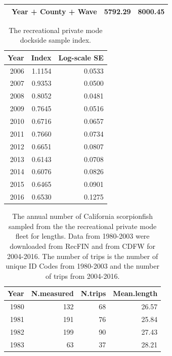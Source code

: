 \documentclass[12pt,]{article}
\begin{document}
\begin{table}[ht]
\begin{tabular}{lll}
  ~Year + County + Wave & \textbf{5792.29} & \textbf{8000.45} \\ 
   \hline
\end{tabular}
\end{table}\begin{table}[ht]
\centering
\caption{The recreational private mode 
                                            dockside sample index.} 
\label{tab:Fleet4_RecPR_dockside_index}
\begin{tabular}{rrr}
  \hline
Year & Index & Log-scale SE \\ 
  \hline
 2006 & 1.1154 & 0.0533 \\ 
   2007 & 0.9353 & 0.0500 \\ 
   2008 & 0.8052 & 0.0481 \\ 
   2009 & 0.7645 & 0.0516 \\ 
   2010 & 0.6716 & 0.0657 \\ 
   2011 & 0.7660 & 0.0734 \\ 
   2012 & 0.6651 & 0.0807 \\ 
   2013 & 0.6143 & 0.0708 \\ 
   2014 & 0.6076 & 0.0826 \\ 
   2015 & 0.6465 & 0.0901 \\ 
   2016 & 0.6530 & 0.1275 \\ 
   \hline
\end{tabular}
\end{table}\begin{table}[ht]
\centering
\caption{The annual number of California scorpionfish 
                                              sampled from the the recreational private 
                                              mode fleet for lengths. Data from 1980-2003
                                            were downloaded from RecFIN and from CDFW for
                                            2004-2016. The number of trips is the number
                                            of unique ID Codes from 1980-2003 and the 
                                            number of trips from 2004-2016.} 
\label{tab:Fleet4_lengthsample}
\begin{tabular}{rrrr}
  \hline
Year & N.measured & N.trips & Mean.length \\ 
  \hline
1980 & 132 &  68 & 26.57 \\ 
  1981 & 191 &  76 & 25.84 \\ 
  1982 & 199 &  90 & 27.43 \\ 
  1983 &  63 &  37 & 28.21 \\ 

\end{tabular}
\end{table}
\end{document}
